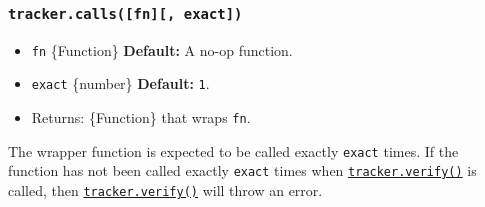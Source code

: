 \begin{Shaded}
\begin{Highlighting}[]
\OperatorTok{=} \NormalTok{(}\NormalTok{)}\OperatorTok{;}

\OperatorTok{=} \NormalTok{()}\OperatorTok{;}

 \NormalTok{() \{\}}

\OperatorTok{=}\OperatorTok{,} \NormalTok{)}\OperatorTok{;}

\NormalTok{()}\OperatorTok{;}

\NormalTok{(}\OperatorTok{,}\NormalTok{ () }\KeywordTok{=\textgreater{}}\NormalTok{ \{}
\NormalTok{()}\OperatorTok{;}
\NormalTok{\})}\OperatorTok{;}
\end{Highlighting}
\end{Shaded}

\subsubsection{\texorpdfstring{\texttt{tracker.calls({[}fn{]}{[},\ exact{]})}}{tracker.calls({[}fn{]}{[}, exact{]})}}\label{tracker.callsfn-exact}

\begin{itemize}
\tightlist
\item
  \texttt{fn} \{Function\} \textbf{Default:} A no-op function.
\item
  \texttt{exact} \{number\} \textbf{Default:} \texttt{1}.
\item
  Returns: \{Function\} that wraps \texttt{fn}.
\end{itemize}

The wrapper function is expected to be called exactly \texttt{exact}
times. If the function has not been called exactly \texttt{exact} times
when \hyperref[trackerverify]{\texttt{tracker.verify()}} is called, then
\hyperref[trackerverify]{\texttt{tracker.verify()}} will throw an error.

